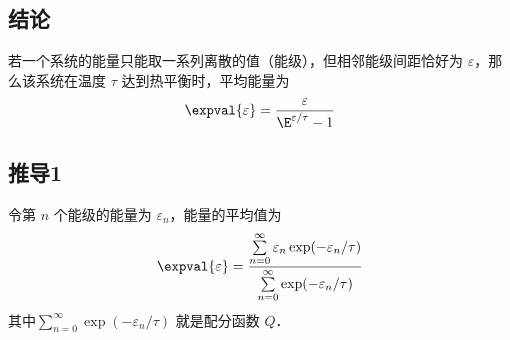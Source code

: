 

\subsection{结论}
若一个系统的能量只能取一系列离散的值（能级），但相邻能级间距恰好为 $\varepsilon$，那么该系统在温度 $\tau$ 达到热平衡时，平均能量为
\begin{equation}
\expval{\varepsilon} = \frac{\varepsilon}{\E^{\varepsilon/\tau} - 1}
\end{equation}

\subsection{推导1}
令第 $n$ 个能级的能量为 $\varepsilon_n$，能量的平均值为
\begin{equation}\label{EqCE_eq2}
\expval{\varepsilon} = \frac{\sum\limits_{n = 0}^\infty  {{\varepsilon_n}\exp (-\varepsilon_n/\tau)} }{\sum\limits_{n = 0}^\infty  {\exp (-\varepsilon_n/\tau)}}
\end{equation}
其中$\sum\limits_{n = 0}^\infty  {\exp \left( { - {\varepsilon_n}/\tau } \right)}$ 就是配分函数 $Q$．

